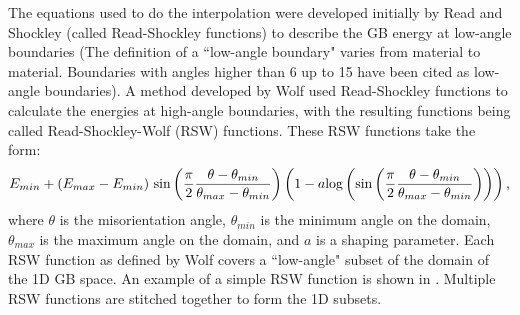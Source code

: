 \documentclass[12pt]{report}
\begin{document}
The equations used to do the interpolation were developed initially by Read and Shockley\cite{read1950} (called Read-Shockley functions) to describe the GB energy at low-angle boundaries (The definition of a ``low-angle boundary" varies from material to material.  Boundaries with angles higher than\cite{rohrer2011} 6\textdegree{} up to\cite{wolf1989} 15\textdegree{} have been cited as low-angle boundaries).  A method developed by Wolf\cite{wolf1989} used Read-Shockley functions to calculate the energies at high-angle boundaries, with the resulting functions being called Read-Shockley-Wolf (RSW) functions.  These RSW functions take the form:
\begin{equation}
E_{min} + (E_{max} - E_{min})\ \textnormal{sin}\left(\frac{\pi}{2}\frac{\theta-\theta_{min}}{\theta_{max} - \theta_{min}}\right)\left(1-a\textnormal{log}\left(\textnormal{sin}\left(\frac{\pi}{2}\frac{\theta-\theta_{min}}{\theta_{max} - \theta_{min}}\right)\right)\right),
\end{equation}
where $\theta$ is the misorientation angle, $\theta_{min}$ is the minimum angle on the domain, $\theta_{max}$ is the maximum angle on the domain, and $a$ is a shaping parameter.  Each RSW function as defined by Wolf covers a ``low-angle" subset of the domain of the 1D GB space.  An example of a simple RSW function is shown in .  Multiple RSW functions are stitched together to form the 1D subsets.
\end{document}

